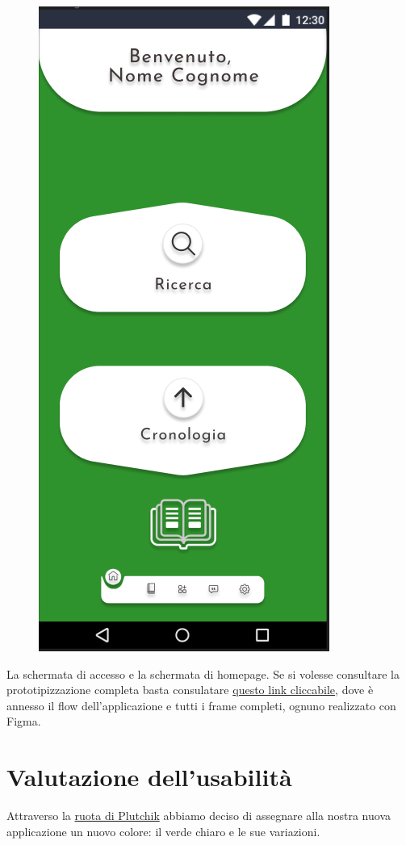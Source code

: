 \begin{figure}
\begin{minipage}{.5\textwidth}
              \includegraphics[width=.60\textwidth]{Immagini/Alexandria/Screen/homepage.PNG} 

\end{minipage}
\end{figure}

La schermata di accesso e la schermata di homepage. Se si volesse consultare la prototipizzazione completa basta consulatare \href{https://www.figma.com/file/O9LZ0W5HYZAW2BCnP167fL/Alexandria?node-id=0%3A1&t=rqKqdyohunSYcSgf-1}{questo link cliccabile}, dove è annesso il flow dell'applicazione e tutti i frame completi, ognuno realizzato con Figma.


\raggedright{\section{Valutazione dell'usabilità}}
Attraverso la \href{https://www.my-personaltrainer.it/salute-benessere/la-ruota-delle-emozioni-di-plutchik-cos-e-a-cosa-serve-e-quali-sono-i-suoi-benefici.html}{ruota di Plutchik} abbiamo deciso di assegnare alla nostra nuova applicazione un nuovo colore: il verde chiaro e le sue variazioni.

